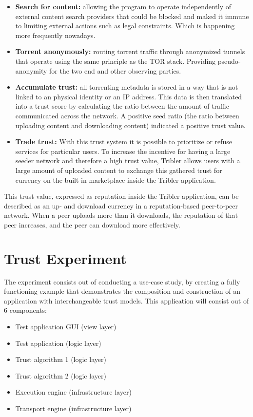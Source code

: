 \begin{itemize}
	\item \textbf{Search for content: } allowing the program to operate independently of external content search providers that could be blocked and maked it immune to limiting external actions such as legal constraints. Which is happening more frequently nowadays.
	\item \textbf{Torrent anonymously: } routing torrent traffic through anonymized tunnels that operate using the same principle as the TOR stack. Providing pseudo-anonymity for the two end and other observing parties.
	\item \textbf{Accumulate trust: } all torrenting metadata is stored in a way that is not linked to an physical identity or an IP address. This data is then translated into a trust score by calculating the ratio between the amount of traffic communicated across the network. A positive seed ratio (the ratio between uploading content and downloading content) indicated a positive trust value.
	\item \textbf{Trade trust: } With this trust system it is possible to prioritize or refuse services for particular users. To increase the incentive for having a large seeder network and therefore a high trust value, Tribler allows users with a large amount of uploaded content to exchange this gathered trust for currency on the built-in marketplace inside the Tribler application.
\end{itemize}

This trust value, expressed as reputation inside the Tribler application, can be described as an up- and download currency in a reputation-based peer-to-peer network. When a peer uploads more than it downloads, the reputation of that peer increases, and the peer can download more effectively.

\section{Trust Experiment}

The experiment consists out of conducting a use-case study, by creating a fully functioning example that demonstrates the composition and construction of an application with interchangeable trust models. This application will consist out of 6 components:

\begin{itemize}
	\item Test application GUI (view layer)
	\item Test application (logic layer)
	\item Trust algorithm 1 (logic layer)
	\item Trust algorithm 2 (logic layer)
	\item Execution engine (infrastructure layer)
	\item Transport engine (infrastructure layer)
\end{itemize}

